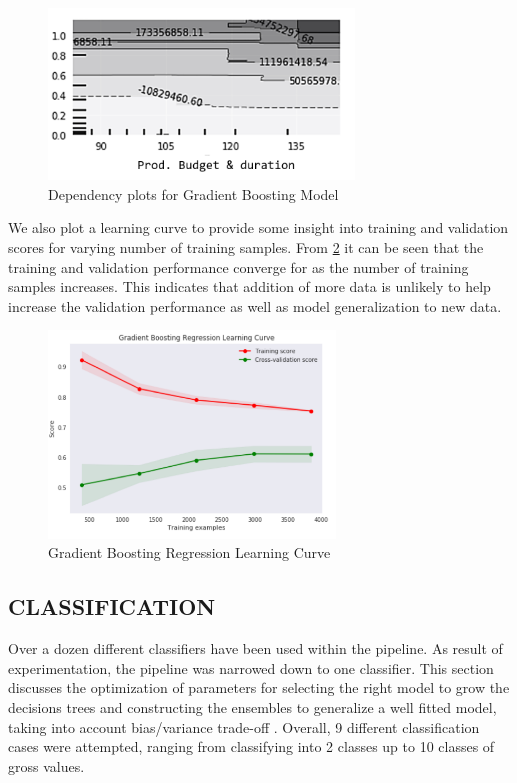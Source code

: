 \begin{figure}[h]
\centering
\includegraphics[width=3.2in]{figures/gb_dependency_4}
\caption{Dependency plots for Gradient Boosting Model} 
\label{fig:gradient_boost_dependency}
\end{figure}

We also plot a learning curve to provide some insight into training and validation scores for varying number of training samples. From \figurename{} \ref{fig:gradient_boost} it can be seen that the training and validation performance converge for as the number of training samples increases. This indicates that addition of  more data is unlikely to help increase the validation performance as well as model generalization to new data.

\begin{figure}[h]
\centering
\includegraphics[width=3.0in]{figures/gradient_boost}
\caption{Gradient Boosting Regression Learning Curve} 
\label{fig:gradient_boost}
\end{figure}

\subsection{CLASSIFICATION}

Over a dozen different classifiers have been used within the pipeline. As result of experimentation, the pipeline was narrowed down to one classifier. This section discusses the optimization of parameters for selecting the right model to grow the decisions trees and constructing the ensembles to generalize a well fitted model, taking into account bias/variance trade-off \cite{biasvariance}. Overall, 9 different classification cases were attempted, ranging from classifying into 2 classes up to 10 classes of gross values. 

